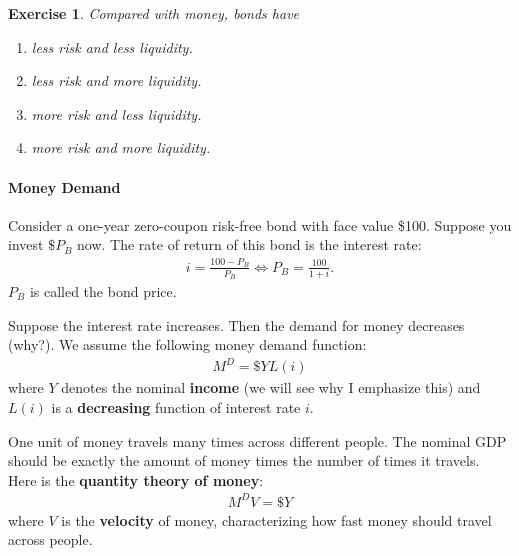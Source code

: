 \documentclass[12pt]{article}
\newtheorem{exercise}{Exercise}
\begin{document}
\begin{exercise}
    Compared with money, bonds have
	\begin{enumerate}[label=\Alph*.]
		\item less risk and less liquidity.
		\item less risk and more liquidity.
		\item more risk and less liquidity.
		\item more risk and more liquidity.
	\end{enumerate}
\end{exercise}

\paragraph{Money Demand}
Consider a one-year zero-coupon risk-free bond with face value \$100. Suppose you invest $\$ P_B$ now. The rate of return of this bond is the interest rate:
\begin{align*}
	i = \frac{100 - P_B}{P_B} \iff P_B = \frac{100}{1 + i}.
\end{align*}
$P_B$ is called the bond price.

Suppose the interest rate increases. Then the demand for money decreases (why?). We assume the following money demand function:
\begin{align*}
	M^D = \$ Y L(i)
\end{align*}
where $Y$ denotes the nominal \textbf{income} (we will see why I emphasize this) and $L(i)$ is a \textbf{decreasing} function of interest rate $i$. 

One unit of money travels many times across different people. The nominal GDP should be exactly the amount of money times the number of times it travels. Here is the \textbf{quantity theory of money}:
\begin{align*}
	M^D V = \$ Y
\end{align*}
where $V$ is the \textbf{velocity} of money, characterizing how fast money should travel across people.
\end{document}
